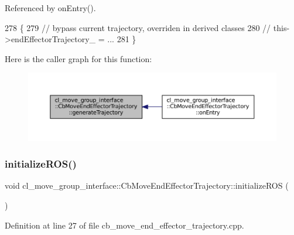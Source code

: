Referenced by on\+Entry().


\begin{DoxyCode}
278     \{
279         \textcolor{comment}{// bypass current trajectory, overriden in derived classes}
280         \textcolor{comment}{// this->endEffectorTrajectory\_ = ...}
281     \}
\end{DoxyCode}
Here is the caller graph for this function\+:
\nopagebreak
\begin{figure}[H]
\begin{center}
\leavevmode
\includegraphics[width=350pt]{classcl__move__group__interface_1_1CbMoveEndEffectorTrajectory_aeae938ab66e18ab7d2fb2427bc83647b_icgraph}
\end{center}
\end{figure}
\mbox{\label{classcl__move__group__interface_1_1CbMoveEndEffectorTrajectory_afcee8f3853a5cef8806137a304c8a14b}} 
\subsubsection{\texorpdfstring{initialize\+R\+O\+S()}{initializeROS()}}
{\footnotesize\ttfamily void cl\+\_\+move\+\_\+group\+\_\+interface\+::\+Cb\+Move\+End\+Effector\+Trajectory\+::initialize\+R\+OS (\begin{DoxyParamCaption}{ }\end{DoxyParamCaption})\hspace{0.3cm}{\ttfamily [private]}}



Definition at line 27 of file cb\+\_\+move\+\_\+end\+\_\+effector\+\_\+trajectory.\+cpp.



